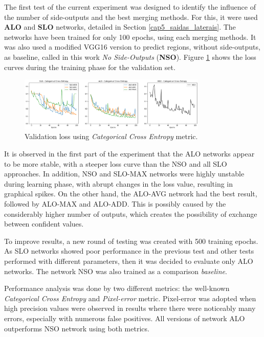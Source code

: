 The first test of the current experiment was designed to identify the influence of the number of side-outputs and the best merging methods.
For this, it were used \textbf{ALO} and \textbf{SLO} networks, detailed in Section \ref{cap5_saidas_laterais}.
The networks have been trained for only 100 epochs, using each merging methods.
It was also used a modified VGG16 version to predict regions, without side-outputs, as baseline, called in this work \textit{No Side-Outputs} (\textbf{NSO}).
Figure \ref{fig:kitti_validation_loss_100epochs} shows the loss curves during the training phase for the validation set.

\begin{figure}
  \centering
  \includegraphics[width=0.8\textwidth]{../imagens/visualiz_dados/kitti_alo-slo-nso_training.png}
  \caption{Validation loss using \textit{Categorical Cross Entropy} metric.}
  \label{fig:kitti_validation_loss_100epochs}
\end{figure}

It is observed in the first part of the experiment that the ALO networks appear to be more stable, with a steeper loss curve than the NSO and all SLO approaches.
In addition, NSO and SLO-MAX networks were highly unstable during learning phase, with abrupt changes in the loss value, resulting in graphical spikes.
On the other hand, the ALO-AVG network had the best result, followed by ALO-MAX and ALO-ADD.
This is possibly caused by the considerably higher number of outputs, which creates the possibility of exchange between confident values.

To improve results, a new round of testing was created with 500 training epochs.
As SLO networks showed poor performance in the previous test and other tests performed with different parameters, then it was decided to evaluate only ALO networks.
The network NSO was also trained as a comparison \textit{baseline}.

Performance analysis was done by two different metrics: the well-known \textit{Categorical Cross Entropy} and \textit{Pixel-error} metric.
Pixel-error was adopted when high precision values were observed in results where there were noticeably many errors, especially with numerous false positives.
All versions of network ALO outperforms NSO network using both metrics.

